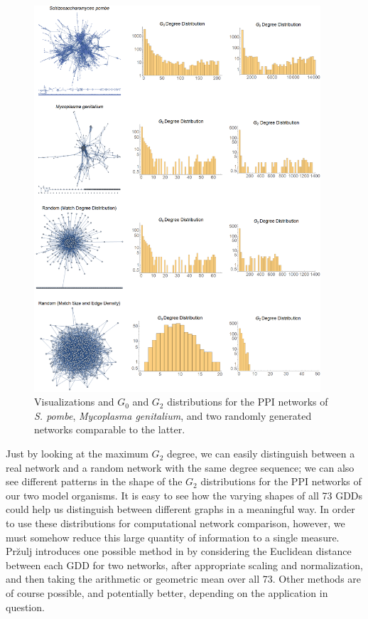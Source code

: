 \documentclass[12pt]{thesis}
\theoremstyle{plain}
\theoremstyle{definition}
\theoremstyle{remark}
\begin{document}
\begin{figure}[!ph]
\centering
\includegraphics[width=0.95\textwidth]{graphlet_degree_distributions.png}
\caption{Visualizations and $G_0$ and $G_2$ distributions for the PPI networks of \textit{S. pombe}, \textit{Mycoplasma genitalium}, and two randomly generated networks comparable to the latter.}
\label{fig:GDD_demo}
\end{figure}

Just by looking at the maximum $G_2$ degree, we can easily distinguish between a real network and a random network with the same degree sequence; we can also see different patterns in the shape of the $G_2$ distributions for the PPI networks of our two model organisms. It is easy to see how the varying shapes of all 73 GDDs could help us distinguish between different graphs in a meaningful way. In order to use these distributions for computational network comparison, however, we must somehow reduce this large quantity of information to a single measure. Pr\u{z}ulj introduces one possible method in \cite{Przulj_2007} by considering the Euclidean distance between each GDD for two networks, after appropriate scaling and normalization, and then taking the arithmetic or geometric mean over all 73. Other methods are of course possible, and potentially better, depending on the application in question.
\end{document}
